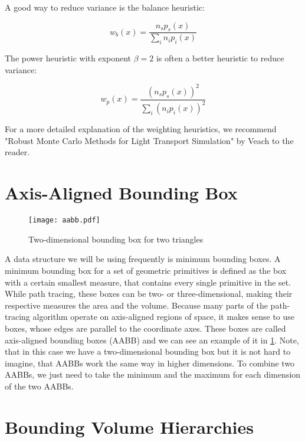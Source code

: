 A good way to reduce variance is the balance heuristic:

\begin{equation}
w_b(x) = \frac{n_s p_s(x)}{\sum_{i}n_i p_i(x)}
\end{equation}

The power heuristic with exponent $\beta = 2$ is often a better heuristic to reduce variance:

\begin{equation}
w_p(x) = \frac{(n_s p_s(x))^2}{\sum_{i}(n_i p_i(x))^2}
\end{equation}

For a more detailed explanation of the weighting heuristics, we recommend "Robust Monte Carlo Methods for Light Transport Simulation" by Veach to the reader. \cite{RMCM}

\section{Axis-Aligned Bounding Box}
\label{sec:aabb}
\begin{figure}
	\begin{center}
		\texttt{[image: aabb.pdf]}
		\caption{Two-dimensional bounding box for two triangles}
		\label{fig:aabb}
	\end{center}
\end{figure}

A data structure we will be using frequently is minimum bounding boxes. A minimum bounding box for a set of geometric primitives is defined as the box with a certain smallest measure, that contains every single primitive in the set. While path tracing, these boxes can be two- or three-dimensional, making their respective measures the area and the volume. Because many parts of the path-tracing algorithm operate on axis-aligned regions of space, it makes sense to use boxes, whose edges are parallel to the coordinate axes. These boxes are called axis-aligned bounding boxes (AABB) and we can see an example of it in {\ref{fig:aabb}}. Note, that in this case we have a two-dimensional bounding box but it is not hard to imagine, that AABBs work the same way in higher dimensions. To combine two AABBs, we just need to take the minimum and the maximum for each dimension of the two AABBs.

\section{Bounding Volume Hierarchies}
\label{sec:preliminaries:bvh}

